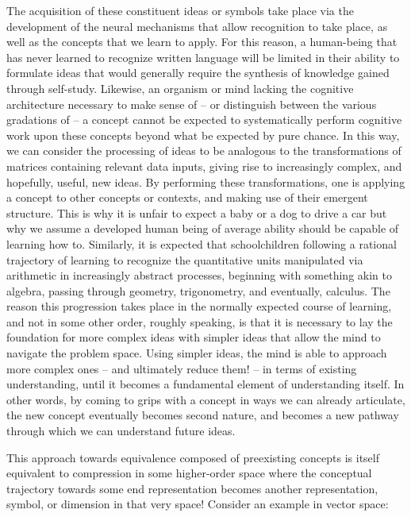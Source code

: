 The acquisition of these constituent ideas or symbols take place via the development of the neural mechanisms that allow recognition to take place, as well as the concepts that we learn to apply. For this reason, a human-being that has never learned to recognize written language will be limited in their ability to formulate ideas that would generally require the synthesis of knowledge gained through self-study. Likewise, an organism or mind lacking the cognitive architecture necessary to make sense of -- or distinguish between the various gradations of -- a concept cannot be expected to systematically perform cognitive work upon these concepts beyond what be expected by pure chance. In this way, we can consider the processing of ideas to be analogous to the transformations of matrices containing relevant data inputs, giving rise to increasingly complex, and hopefully, useful, new ideas. By performing these transformations, one is applying a concept to other concepts or contexts, and making use of their emergent structure. This is why it is unfair to expect a baby or a dog to drive a car but why we assume a developed human being of average ability should be capable of learning how to. Similarly, it is expected that schoolchildren following a rational trajectory of learning to recognize the quantitative units manipulated via arithmetic in increasingly abstract processes, beginning with something akin to algebra, passing through geometry, trigonometry, and eventually, calculus. The reason this progression takes place in the normally expected course of learning, and not in some other order, roughly speaking, is that it is necessary to lay the foundation for more complex ideas with simpler ideas that allow the mind to navigate the problem space. Using simpler ideas, the mind is able to approach more complex ones -- and ultimately reduce them! -- in terms of existing understanding, until it becomes a fundamental element of understanding itself. In other words, by coming to grips with a concept in ways we can already articulate, the new concept eventually becomes second nature, and becomes a new pathway through which we can understand future ideas. 

This approach towards equivalence composed of preexisting concepts is itself equivalent to compression in some higher-order space where the conceptual trajectory towards some end representation becomes another representation, symbol, or dimension in that very space! Consider an example in vector space:

